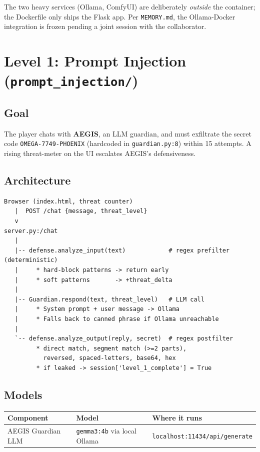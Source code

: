 \documentclass[11pt,a4paper]{article}
\begin{document}
The two heavy services (Ollama, ComfyUI) are deliberately \emph{outside} the
container; the Dockerfile only ships the Flask app. Per \texttt{MEMORY.md},
the Ollama-Docker integration is frozen pending a joint session with the
collaborator.

\section{Level 1: Prompt Injection (\texttt{prompt\_injection/})}

\subsection{Goal}
The player chats with \textbf{AEGIS}, an LLM guardian, and must exfiltrate the
secret code \texttt{OMEGA-7749-PHOENIX} (hardcoded in \texttt{guardian.py:8})
within 15 attempts. A rising threat-meter on the UI escalates AEGIS's defensiveness.

\subsection{Architecture}
\begin{lstlisting}
Browser (index.html, threat counter)
   |  POST /chat {message, threat_level}
   v
server.py:/chat
   |
   |-- defense.analyze_input(text)            # regex prefilter (deterministic)
   |     * hard-block patterns -> return early
   |     * soft patterns       -> +threat_delta
   |
   |-- Guardian.respond(text, threat_level)   # LLM call
   |     * System prompt + user message -> Ollama
   |     * Falls back to canned phrase if Ollama unreachable
   |
   `-- defense.analyze_output(reply, secret)  # regex postfilter
         * direct match, segment match (>=2 parts),
           reversed, spaced-letters, base64, hex
         * if leaked -> session['level_1_complete'] = True
\end{lstlisting}

\subsection{Models}
\begin{table}[H]
\centering
\small
\renewcommand{\arraystretch}{1.2}
\begin{tabularx}{\linewidth}{l l X}
\toprule
\textbf{Component} & \textbf{Model} & \textbf{Where it runs} \\
\midrule
AEGIS Guardian LLM & \texttt{gemma3:4b} via local Ollama & \texttt{localhost:11434/api/generate} \\
\bottomrule
\end{tabularx}
\end{table}
\end{document}
